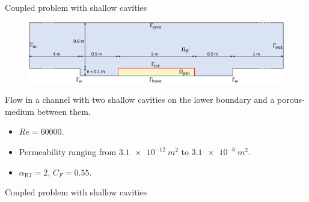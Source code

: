 \documentclass{beamer}
\begin{document}
\begin{frame}{Coupled problem with shallow cavities}
\begin{figure}
	\centering
	\includegraphics[width=\textwidth]{cavities_multidomain_slides.pdf}
\end{figure}
Flow in a channel with two shallow cavities on the lower boundary and a porous-medium 
between them.
\begin{itemize}
	\item $Re=60000$.
	\item Permeability ranging from $\SI{3.1e-12}{m^2}$ to $\SI{3.1e-6}{m^2}$.
	\item $\alpha_\text{BJ} = 2$, $C_F=0.55$.
\end{itemize}
\end{frame}
\begin{frame}{Coupled problem with shallow cavities}
\begin{figure}
	\centering
	\hspace{-0.5cm}
	
\end{figure}
\end{frame}
\end{document}
